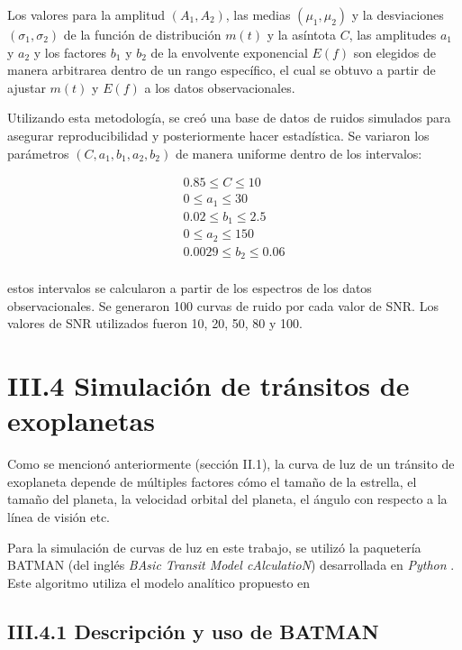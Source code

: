 Los valores para la amplitud $(A_{1},A_{2})$, las medias  $(\mu_{1},\mu_{2})$ y la desviaciones $(\sigma_{1},\sigma_{2})$ de la función de distribución $m(t)$ y la asíntota $C$, las amplitudes $a_{1}$ y $a_{2}$ y los factores $b_{1}$ y $b_{2}$ de la envolvente exponencial $E(f)$ son elegidos de manera arbitrarea dentro de un rango específico, el cual se obtuvo a partir de ajustar $m(t)$ y $E(f)$ a los datos observacionales. 

Utilizando esta metodología, se creó una base de datos de ruidos simulados para asegurar reproducibilidad y posteriormente hacer estadística. Se variaron los parámetros $(C,a_{1},b_{1},a_{2},b_{2})$ de manera uniforme dentro de los intervalos:

\begin{equation}
  \begin{split}
  0.85 \leq C \leq 10 \\
  0 \leq a_{1} \leq 30 \\
  0.02 \leq b_{1} \leq 2.5 \\
  0 \leq a_{2} \leq 150 \\
  0.0029 \leq b_{2} \leq 0.06 \\
  \end{split}
\end{equation}

estos intervalos se calcularon a partir de los espectros de los datos observacionales. Se generaron 100 curvas de ruido por cada valor de SNR. Los valores de SNR utilizados fueron 10, 20, 50, 80 y 100.


\section*{III.4 Simulación de tránsitos de exoplanetas}


Como se mencionó anteriormente (sección II.1), la curva de luz de un tránsito de exoplaneta depende de múltiples factores cómo el tamaño de la estrella, el tamaño del planeta, la velocidad orbital del planeta, el ángulo con respecto a la línea de visión etc.

Para la simulación de curvas de luz en este trabajo, se utilizó la paquetería BATMAN (del inglés \textit{BAsic Transit Model cAlculatioN}) desarrollada en \textit{Python} \cite{kreidberg2015batman}. Este algoritmo utiliza el modelo analítico propuesto en \cite{mandel2002analytic}


\subsection*{III.4.1 Descripción y uso de BATMAN}


